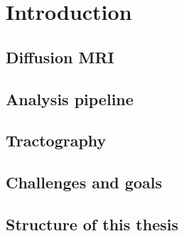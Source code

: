 \chapter{Introduction}


\lipsum[2-5]

\section{Diffusion MRI}
\lipsum[2-5]

\section{Analysis pipeline}
\lipsum[2-5]

\section{Tractography}
\lipsum[2-5]

\section{Challenges and goals}
\lipsum[2-5]

\section{Structure of this thesis}
\lipsum[2-5]